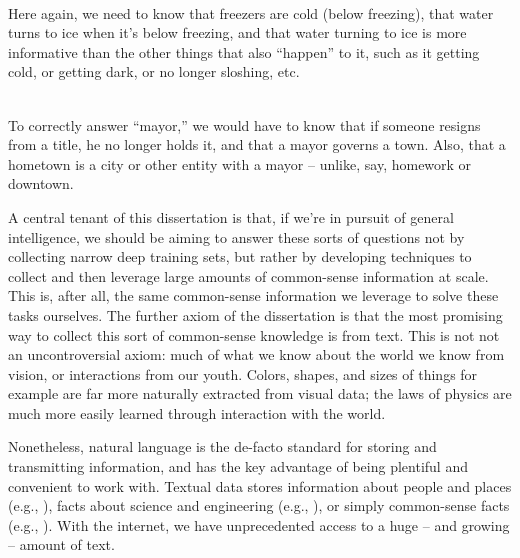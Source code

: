 \begin{displayquote}
   \\
  Here again, we need to know that freezers are cold (below freezing), that water turns to ice
    when it's below freezing, and that water turning to ice is more informative than the other things
    that also ``happen'' to it, such as it getting cold, or getting dark, or no longer sloshing, etc.
\end{displayquote}

\begin{displayquote}
   \\
  To correctly answer ``mayor,'' we would have to know that if someone resigns from a title, he no longer
    holds it, and that a mayor governs a town.
  Also, that a hometown is a city or other entity with a mayor -- unlike, say, homework or downtown.
\end{displayquote}

%
%

A central tenant of this dissertation is that, if we're in pursuit of general intelligence, we should be
  aiming to answer these sorts of questions not by collecting narrow deep training sets, but rather
  by developing techniques to collect and then leverage large amounts of common-sense information at scale.
This is, after all, the same common-sense information we leverage to solve these tasks ourselves.
The further axiom of the dissertation is that the most promising way to collect this sort of 
  common-sense knowledge is from text.
This is not not an uncontroversial axiom: much of what we know about the world we know from
  vision, or interactions from our youth.
Colors, shapes, and sizes of things for example are far more naturally extracted from visual data;
  the laws of physics are much more easily learned through interaction with the world.

Nonetheless, natural language is the de-facto standard for storing and transmitting 
  information, and has the key advantage of being plentiful and convenient to work with.
Textual data stores information about people and places (e.g., ), facts about science and engineering (e.g., ), 
  or simply common-sense facts (e.g., ). 
With the internet, we have unprecedented access to a huge -- and growing -- amount
  of text.

